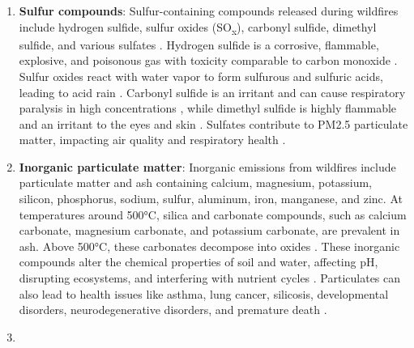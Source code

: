 \documentclass[
  12 pt,
]{Nemilov}
\begin{document}
\begin{enumerate}
\def\labelenumi{\arabic{enumi}.}
\setcounter{enumi}{4}
\item
  \textbf{Sulfur compounds}: Sulfur-containing compounds released during wildfires include hydrogen sulfide, sulfur oxides (SO\textsubscript{x}), carbonyl sulfide, dimethyl sulfide, and various sulfates \citep{flematti2011burning, liu2014wildland, liu2017airborne, urbanski2008chemical, urbanski2014wildland}. Hydrogen sulfide is a corrosive, flammable, explosive, and poisonous gas with toxicity comparable to carbon monoxide \citep{rubright2017environmental}. Sulfur oxides react with water vapor to form sulfurous and sulfuric acids, leading to acid rain \citep{irwin1988acid}. Carbonyl sulfide is an irritant and can cause respiratory paralysis in high concentrations \citep{bartholomaeus2005review, peyton1978carbon}, while dimethyl sulfide is highly flammable and an irritant to the eyes and skin \citep{european2020outcome}. Sulfates contribute to PM2.5 particulate matter, impacting air quality and respiratory health \citep{schlesinger2007health}.
\item
  \textbf{Inorganic particulate matter}: Inorganic emissions from wildfires include particulate matter and ash containing calcium, magnesium, potassium, silicon, phosphorus, sodium, sulfur, aluminum, iron, manganese, and zinc. At temperatures around 500°C, silica and carbonate compounds, such as calcium carbonate, magnesium carbonate, and potassium carbonate, are prevalent in ash. Above 500°C, these carbonates decompose into oxides \citep{bodi2014wildland}. These inorganic compounds alter the chemical properties of soil and water, affecting pH, disrupting ecosystems, and interfering with nutrient cycles \citep{grantz2003ecological, rai2016impacts}. Particulates can also lead to health issues like asthma, lung cancer, silicosis, developmental disorders, neurodegenerative disorders, and premature death \citep{schlesinger2007health}.
\item

\end{enumerate}
\end{document}
